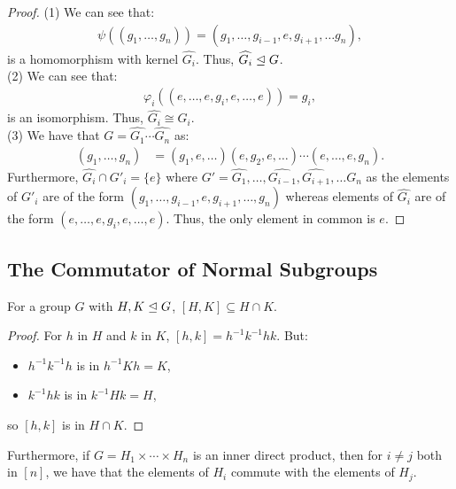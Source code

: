 \begin{proof}
    (1) We can see that: \begin{align*}
        \psi((g_1, \ldots, g_n)) = (g_1, \ldots, g_{i - 1}, e, g_{i + 1}, \ldots g_n),
    \end{align*} is a homomorphism with kernel $\widehat{G_i}$. Thus,
    $\widehat{G_i} \trianglelefteq G$.
    \\[\baselineskip]
    (2) We can see that: \begin{align*}
        \varphi_i((e, \ldots, e, g_i, e, \ldots, e)) = g_i,
    \end{align*} is an isomorphism. Thus, $\widehat{G_i} \cong G_i$.
    \\[\baselineskip]
    (3) We have that $G = \widehat{G_1} \cdots \widehat{G_n}$ as:
    \begin{align*}
        (g_1, \ldots, g_n)
        &= (g_1, e, \ldots)(e, g_2, e, \ldots)
        \cdots (e, \ldots, e, g_n).
    \end{align*} Furthermore, $\widehat{G_i} \cap G'_i = \{e\}$ where
    $G' = \widehat{G_1}, \ldots, \widehat{G_{i - 1}}, \widehat{G_{i + 1}}, 
    \ldots G_n$ as the elements of $G'_i$ are of the form
    $(g_1, \ldots, g_{i - 1}, e, g_{i + 1}, \ldots, g_n)$ whereas elements
    of $\widehat{G_i}$ are of the form $(e, \ldots, e, g_i, e, \ldots, e)$.
    Thus, the only element in common is $e$.
\end{proof}

\subsection{The Commutator of Normal Subgroups}

For a group $G$ with $H, K \trianglelefteq G$, $[H, K] \subseteq H \cap K$.

\begin{proof}
    For $h$ in $H$ and $k$ in $K$, $[h, k] = h^{-1}k^{-1}hk$.
    But: \begin{itemize}
        \item $h^{-1}k^{-1}h$ is in $h^{-1}Kh = K$,
        \item $k^{-1}hk$ is in $k^{-1}Hk = H$,
    \end{itemize} so $[h, k]$ is in $H \cap K$.
\end{proof} 

\noindent
Furthermore, if $G = H_1 \times \cdots \times H_n$
is an inner direct product, then for $i \neq j$ both in $[n]$,
we have that the elements of $H_i$ commute with the elements of
$H_j$.

